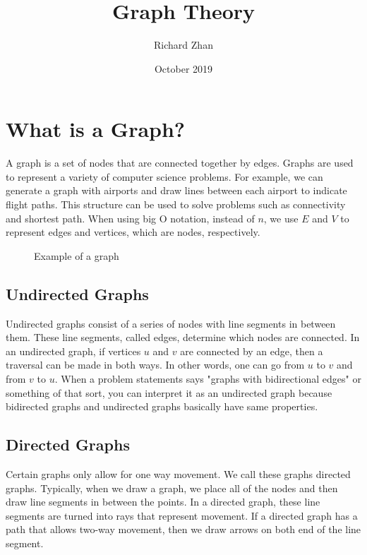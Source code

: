 \documentclass{article}
\title{Graph Theory}
\author{Richard Zhan}
\date{October 2019}
\begin{document}
\maketitle

\section{What is a Graph?}
A graph is a set of nodes that are connected together by edges. Graphs are used to represent a variety of computer science problems. For example, we can generate a graph with airports and draw lines between each airport to indicate flight paths. This structure can be used to solve problems such as connectivity and shortest path. When using big O notation, instead of $n$, we use $E$ and $V$ to represent edges and vertices, which are nodes, respectively.

\begin{figure} [H]
    \begin{center}
    \end{center}
    \caption{Example of a graph}
\end{figure}

\subsection{Undirected Graphs}
Undirected graphs consist of a series of nodes with line segments in between them. These line segments, called edges, determine which nodes are connected. In an undirected graph, if vertices $u$ and $v$ are connected by an edge, then a traversal can be made in both ways. In other words, one can go from $u$ to $v$ and from $v$ to $u$. When a problem statements says "graphs with bidirectional edges" or something of that sort, you can interpret it as an undirected graph because bidirected graphs and undirected graphs basically have same properties.

\subsection{Directed Graphs}
Certain graphs only allow for one way movement. We call these graphs directed graphs. Typically, when we draw a graph, we place all of the nodes and then draw line segments in between the points. In a directed graph, these line segments are turned into rays that represent movement. If a directed graph has a path that allows two-way movement, then we draw arrows on both end of the line segment.
\end{document}
